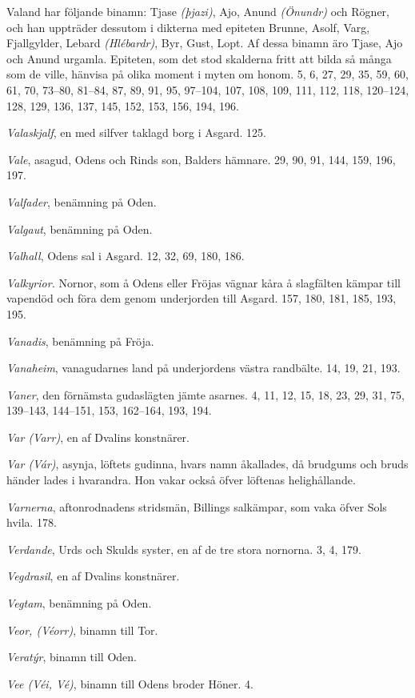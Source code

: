 Valand har följande binamn: Tjase \emph{(þjazi)}, Ajo, Anund
\emph{(Önundr)} och Rögner, och han uppträder dessutom i dikterna med
epiteten Brunne, Asolf, Varg, Fjallgylder, Lebard \emph{(Hlébardr)},
Byr, Gust, Lopt. Af dessa binamn äro Tjase, Ajo och Anund urgamla.
Epiteten, som det stod skalderna fritt att bilda så många som de ville,
hänvisa på olika moment i myten om honom. 5, 6, 27, 29, 35, 59, 60, 61,
70, 73--80, 81--84, 87, 89, 91, 95, 97--104, 107, 108, 109, 111, 112,
118, 120--124, 128, 129, 136, 137, 145, 152, 153, 156, 194, 196.

\emph{Valaskjalf}, en med silfver taklagd borg i Asgard. 125.

\emph{Vale}, asagud, Odens och Rinds son, Balders hämnare. 29, 90, 91,
144, 159, 196, 197.

\emph{Valfader}, benämning på Oden.

\emph{Valgaut}, benämning på Oden.

\emph{Valhall}, Odens sal i Asgard. 12, 32, 69, 180, 186.

\emph{Valkyrior.} Nornor, som å Odens eller Fröjas vägnar kåra å
slagfälten kämpar till vapendöd och föra dem genom underjorden till
Asgard. 157, 180, 181, 185, 193, 195.

\emph{Vanadis}, benämning på Fröja.

\emph{Vanaheim}, vanagudarnes land på underjordens västra randbälte. 14,
19, 21, 193.

\emph{Vaner}, den förnämsta gudaslägten jämte asarnes. 4, 11, 12, 15,
18, 23, 29, 31, 75, 139--143, 144--151, 153, 162--164, 193, 194.

\emph{Var (Varr)}, en af Dvalins konstnärer.

\emph{Var (Vár)}, asynja, löftets gudinna, hvars namn åkallades, då
brudgums och bruds händer lades i hvarandra. Hon vakar också öfver
löftenas helighållande.

\emph{Varnerna}, aftonrodnadens stridsmän, Billings salkämpar, som vaka
öfver Sols hvila. 178.

\emph{Verdande}, Urds och Skulds syster, en af de tre stora nornorna. 3,
4, 179.

\emph{Vegdrasil}, en af Dvalins konstnärer.

\emph{Vegtam}, benämning på Oden.

\emph{Veor, (Véorr)}, binamn till Tor.

\emph{Veratýr}, binamn till Oden.

\emph{Vee (Véi, Vé)}, binamn till Odens broder Höner. 4.

